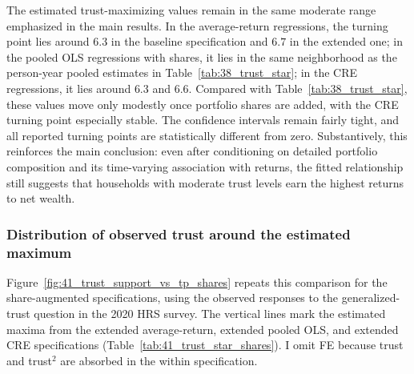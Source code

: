 \begin{table}[!t]
\centering
\caption{\textbf{The Level of Trust which Maximizes Returns with Portfolio-Share Controls}}
\label{tab:41_trust_star_shares}
\begin{threeparttable}
\begingroup
\setlength{\tabcolsep}{3pt}%
\renewcommand{\arraystretch}{0.75}%
\footnotesize%
\resizebox{\textwidth}{!}{%
%
}%
\endgroup
\begin{tablenotes}[flushleft]
\scriptsize
\item {}%
\end{tablenotes}
\end{threeparttable}
\end{table}

\par The estimated trust-maximizing values remain in the same moderate range emphasized in the main results. In the average-return regressions, the turning point lies around $6.3$ in the baseline specification and $6.7$ in the extended one; in the pooled OLS regressions with shares, it lies in the same neighborhood as the person-year pooled estimates in Table~\ref{tab:38_trust_star}; in the CRE regressions, it lies around $6.3$ and $6.6$. Compared with Table~\ref{tab:38_trust_star}, these values move only modestly once portfolio shares are added, with the CRE turning point especially stable. The confidence intervals remain fairly tight, and all reported turning points are statistically different from zero. Substantively, this reinforces the main conclusion: even after conditioning on detailed portfolio composition and its time-varying association with returns, the fitted relationship still suggests that households with moderate trust levels earn the highest returns to net wealth.

\subsubsection{Distribution of observed trust around the estimated maximum}

\par Figure~\ref{fig:41_trust_support_vs_tp_shares} repeats this comparison for the share-augmented specifications, using the observed responses to the generalized-trust question in the 2020 HRS survey. The vertical lines mark the estimated maxima from the extended average-return, extended pooled OLS, and extended CRE specifications (Table~\ref{tab:41_trust_star_shares}). I omit FE because trust and trust$^2$ are absorbed in the within specification.

